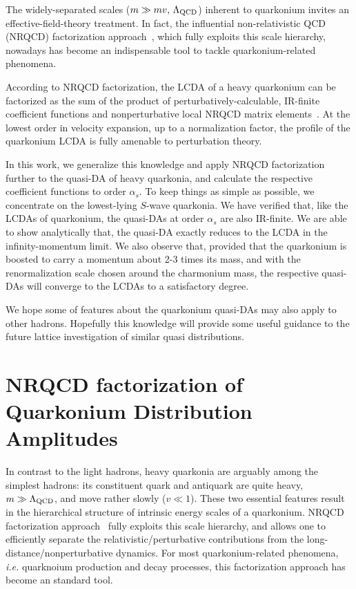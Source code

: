 \documentclass[english,preprint,aps,prd,showpacs,superscriptaddress,nofootinbib,tightenlines]{revtex4}
\begin{document}
The widely-separated scales ($m\gg mv,\,\Lambda_{\rm QCD}$) inherent to quarkonium
invites an effective-field-theory treatment.
In fact, the influential non-relativistic QCD (NRQCD) factorization approach~\cite{Bodwin:1994jh},
which fully exploits this scale hierarchy, nowadays has become an indispensable tool to tackle
quarkonium-related phenomena.

According to NRQCD factorization, the LCDA of a heavy quarkonium can be factorized as
the sum of the product of perturbatively-calculable, IR-finite coefficient functions and nonperturbative local NRQCD matrix elements~\cite{Ma:2006hc,Bell:2008er,Wang:2013ywc}.
At the lowest order in velocity expansion, up to a normalization factor,
the profile of the quarkonium LCDA is fully amenable to perturbation theory.

In this work, we generalize this knowledge and apply NRQCD factorization further to
the quasi-DA of heavy quarkonia, and calculate the respective coefficient functions to order $\alpha_s$.
To keep things as simple as possible, we concentrate on the lowest-lying $S$-wave quarkonia.
We have verified that, like the LCDAs of quarkonium, the quasi-DAs at order $\alpha_s$ are also IR-finite.
We are able to show analytically that, the quasi-DA exactly reduces to the LCDA in the infinity-momentum limit.
We also observe that, provided that the quarkonium is boosted to carry a momentum about 2-3 times its mass,
and with the renormalization scale chosen around the charmonium mass,
the respective quasi-DAs will converge to the LCDAs to a satisfactory degree.

We hope some of features about the quarkonium quasi-DAs may also apply to other hadrons.
Hopefully this knowledge will provide some useful guidance to the future lattice investigation
of similar quasi distributions.


\section{NRQCD factorization of Quarkonium Distribution Amplitudes}
\label{NRQCD:fac:LC:quasi}

In contrast to the light hadrons, heavy quarkonia are arguably among the simplest hadrons:
its constituent quark and antiquark are quite heavy, $m\gg \Lambda_{\rm QCD}$,
and move rather slowly ($v\ll 1$). These two essential features result in the
hierarchical structure of intrinsic energy scales of a quarkonium.
NRQCD factorization approach~\cite{Bodwin:1994jh} fully exploits this scale hierarchy,
and allows one to efficiently separate the relativistic/perturbative contributions from the long-distance/nonperturbative dynamics.
For most quarkonium-related phenomena, {\it i.e.} quarknoium production and decay processes,
this factorization approach has become an standard tool.
\end{document}
